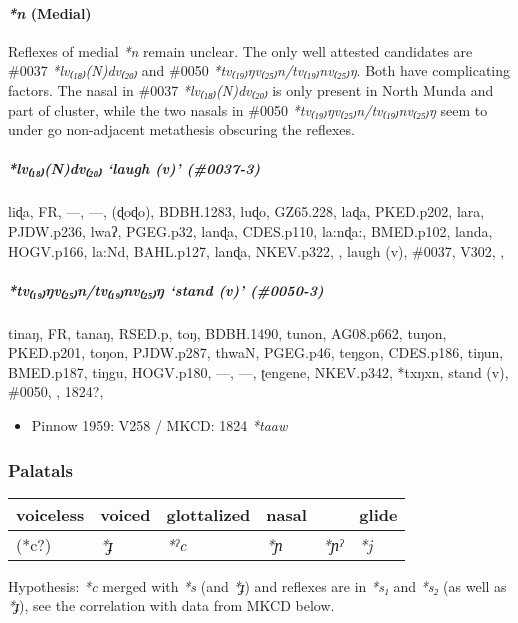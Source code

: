 \documentclass[a4paper,]{article}
\providecommand{\tightlist}{%
  \setlength{\itemsep}{0pt}\setlength{\parskip}{0pt}}
\let\oldparagraph\paragraph
\renewcommand{\paragraph}[1]{\oldparagraph{#1}\mbox{}}
\let\oldsubparagraph\subparagraph
\renewcommand{\subparagraph}[1]{\oldsubparagraph{#1}\mbox{}}
\begin{document}
\paragraph{\texorpdfstring{\emph{*n}
(Medial)}{*n (Medial)}}\label{n-medial}

Reflexes of medial \emph{*n} remain unclear. The only well attested
candidates are \#0037 \emph{*lv₍₁₈₎(N)dv₍₂₀₎} and \#0050
\emph{*tv₍₁₉₎ŋv₍₂₅₎n/tv₍₁₉₎nv₍₂₅₎ŋ}. Both have complicating factors. The
nasal in \#0037 \emph{*lv₍₁₈₎(N)dv₍₂₀₎} is only present in North Munda
and part of cluster, while the two nasals in \#0050
\emph{*tv₍₁₉₎ŋv₍₂₅₎n/tv₍₁₉₎nv₍₂₅₎ŋ} seem to under go non-adjacent
metathesis obscuring the reflexes.

\subparagraph{\texorpdfstring{\emph{*lv₍₁₈₎(N)dv₍₂₀₎} `laugh (v)'
(\#0037-3)}{*lv₍₁₈₎(N)dv₍₂₀₎ laugh (v) (\#0037-3)}}\label{lvndv-laugh-v-0037-3}

liɖa, FR, ---, ---, (ɖoɖo), BDBH.1283, luɖo, GZ65.228, laɖa, PKED.p202,
lara, PJDW.p236, lwaʔ, PGEG.p32, lanɖa, CDES.p110, la:nɖa:, BMED.p102,
landa, HOGV.p166, la:Nd, BAHL.p127, lanɖa, NKEV.p322, , laugh (v),
\#0037, V302, ,

\subparagraph{\texorpdfstring{\emph{*tv₍₁₉₎ŋv₍₂₅₎n/tv₍₁₉₎nv₍₂₅₎ŋ} `stand
(v)'
(\#0050-3)}{*tv₍₁₉₎ŋv₍₂₅₎n/tv₍₁₉₎nv₍₂₅₎ŋ stand (v) (\#0050-3)}}\label{tvux14bvntvnvux14b-stand-v-0050-3}

tinaŋ, FR, tanaŋ, RSED.p, toŋ, BDBH.1490, tunon, AG08.p662, tuŋon,
PKED.p201, toŋon, PJDW.p287, thwaN, PGEG.p46, teŋgon, CDES.p186, tiŋun,
BMED.p187, tiŋgu, HOGV.p180, ---, ---, ʈengene, NKEV.p342, *txŋxn, stand
(v), \#0050, , 1824?,

\begin{itemize}
\tightlist
\item
  Pinnow 1959: V258 / MKCD: 1824 \emph{*taaw}
\end{itemize}

\subsubsection{Palatals}\label{palatals}

\begin{longtable}[]{@{}llllll@{}}
\toprule
voiceless & voiced & glottalized & nasal & & glide\tabularnewline
\midrule
\endhead
(*c?) & \emph{*ɟ} & \emph{*ˀc} & \emph{*ɲ} & \emph{*ɲˀ} &
\emph{*j}\tabularnewline
\bottomrule
\end{longtable}

Hypothesis: \emph{*c} merged with \emph{*s} (and \emph{*ɟ}) and reflexes
are in \emph{*s₁} and \emph{*s₂} (as well as \emph{*ɟ}), see the
correlation with data from MKCD below.
\end{document}

